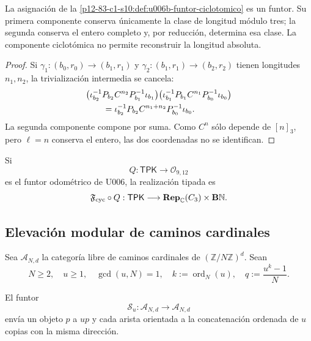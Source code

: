 {\begin{theorem}
\label{p12-83-c1-s10:thm:u006b-functorialidad}
La asignación de la \cref{p12-83-c1-s10:def:u006b-funtor-ciclotomico} es un funtor. Su
primera componente conserva únicamente la clase de longitud módulo tres; la
segunda conserva el entero completo y, por reducción, determina esa clase.
La componente ciclotómica no permite reconstruir la longitud absoluta.
\end{theorem}

\begin{proof}
Si \(\gamma_1:(b_0,r_0)\to(b_1,r_1)\) y
\(\gamma_2:(b_1,r_1)\to(b_2,r_2)\) tienen longitudes \(n_1,n_2\), la
trivialización intermedia se cancela:
\begin{align}
 &\bigl(
 \iota_{b_2}^{-1}P_{b_2}C^{n_2}P_{b_1}^{-1}\iota_{b_1}
 \bigr)
 \bigl(
 \iota_{b_1}^{-1}P_{b_1}C^{n_1}P_{b_0}^{-1}\iota_{b_0}
 \bigr)\notag\\
 &\qquad=
 \iota_{b_2}^{-1}P_{b_2}C^{n_1+n_2}
 P_{b_0}^{-1}\iota_{b_0}.
 \label{p12-83-c1-s10:eq:u006b-composicion-funtor}
\end{align}
La segunda componente compone por suma. Como \(C^n\) sólo depende de
\([n]_3\), pero \(\ell=n\) conserva el entero, las dos coordenadas no se
identifican.
\end{proof}

Si
\[
 Q:\mathsf{TPK}\longrightarrow\mathcal O_{9,12}
\]
es el funtor odométrico de U006, la realización tipada es
\begin{equation}
 \mathfrak F_{\rm cyc}\circ Q:
 \mathsf{TPK}\longrightarrow
 \mathbf{Rep}_{\mathbb C}(C_3)\times\mathbf B\mathbb N.
 \label{p12-83-c1-s10:eq:u006b-compuesto-tpk-ciclotomico}
\end{equation}

\subsection{Elevación modular de caminos cardinales}

Sea \(\mathcal A_{N,d}\) la categoría libre de caminos cardinales de
\((\mathbb Z/N\mathbb Z)^d\). Sean
\[
 N\ge2,\quad u\ge1,\quad\gcd(u,N)=1,
 \quad k:=\operatorname{ord}_N(u),
 \quad q:=\frac{u^k-1}{N}.
\]

\begin{definition}
\label{p12-83-c1-s10:def:u006b-sustitucion-cardinal}
El funtor
\[
 \mathcal S_u:\mathcal A_{N,d}\longrightarrow\mathcal A_{N,d}
\]
envía un objeto \(p\) a \(up\) y cada arista orientada a la concatenación
ordenada de \(u\) copias con la misma dirección.
\end{definition}

}
